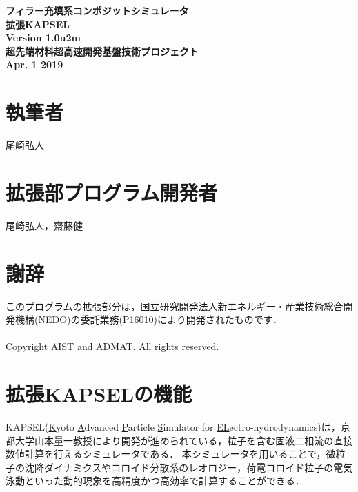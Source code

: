 \documentclass[pdflatex,a4paper,10pt,ja=standard]{bxjsarticle}
\begin{document}
\thispagestyle{empty}
{\centering
\vspace*{15truemm}
{\LARGE \textbf {フィラー充填系コンポジットシミュレータ}}\\
\vspace*{5truemm}
{\Huge \textbf {拡張KAPSEL}}\\
\vspace*{5truemm}
{\LARGE \textbf {Version 1.0u2m}}\\
\vspace*{140truemm}
{\Large \textbf {超先端材料超高速開発基盤技術プロジェクト}}\\
\vspace*{3truemm}
{\Large \textbf {Apr. 1 2019}}\\
}
\clearpage
\thispagestyle{empty}

\section*{執筆者}
尾崎弘人

\section*{拡張部プログラム開発者}
尾崎弘人，齋藤健

\section*{謝辞}
このプログラムの拡張部分は，国⽴研究開発法⼈新エネルギー・産業技術総合開発機構(NEDO)の委託業務(P16010)により開発されたものです．
\\
\\
Copyright  AIST and ADMAT. All rights reserved.

\clearpage

\addtocounter{page}{-2}
\section{拡張KAPSELの機能}
KAPSEL(\underline{K}yoto \underline{A}dvanced \underline{P}article \underline{S}imulator for \underline{EL}ectro-hydrodynamics)は，京都大学山本量一教授により開発が進められている，粒子を含む固液二相流の直接数値計算を行えるシミュレータである\autocite{kapsel,nakayama2005simulation}．
本シミュレータを用いることで，微粒子の沈降ダイナミクスやコロイド分散系のレオロジー，荷電コロイド粒子の電気泳動といった動的現象を高精度かつ高効率で計算することができる．
\end{document}
